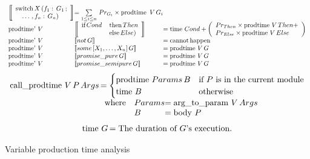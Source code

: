 \begin{algorithm}
\[\begin{array}{l @{}l @{}l}
    \left\llbracket
    \begin{array}{l}
        \hbox{switch}\,X\,(f_1:\,G_1\,; \\
        \quad\ldots\,,f_n:\,G_n)
    \end{array}
    \right\rrbracket &=
    \sum\limits_{1 \leq i \leq n}\,Pr_{G_i} \times \prodtime\,V\,G_i \\
\prodtimep V\,& 
    \left\llbracket
    \begin{array}{ll}
        \hbox{if}\,Cond\,&\hbox{then}\,Then \\
                         &\hbox{else}\,Else)
    \end{array}
    \right\rrbracket &= \timef Cond +
    \left(
        \begin{array}{l}
            Pr_{Then} \times \prodtime V\,Then+ \\
            Pr_{Else} \times \prodtime V\,Else
        \end{array}
    \right) \\
\prodtimep V\,& \pat{not\,G}                       &= \canthappen \\
\prodtimep V\,& \pat{some\,[X_1,\ldots,X_n]\,G}    &= \prodtime V\,G \\
\prodtimep V\,& \pat{promise\_pure\,G}             &= \prodtime V\,G \\
\prodtimep V\,& \pat{promise\_semipure\,G}         &= \prodtime V\,G \\
\end{array}
\]
\[
\begin{array}{l @{}l}
\callprodtime V\,P\,Args        \,&=
    \begin{cases}
        \prodtime Params\,B &
            \text{if } P \text{ is in the current module} \\
        \timef B &
            \text{otherwise}
    \end{cases} \\
    & \begin{array}{l l @{}l}
    \text{where} & Params  &= \operatorname{arg\_to\_param}\, V\, Args \\
                 & B       &= \operatorname{body}\, P \\
    \end{array}
\end{array}
\]
\[
\begin{array}{l @{}l}
\timef G    \,&= \text{The duration of } G\text{'s execution.} \\
\end{array}
\]
\caption{Variable production time analysis}
\label{alg:var_prod_time}
\end{algorithm}

